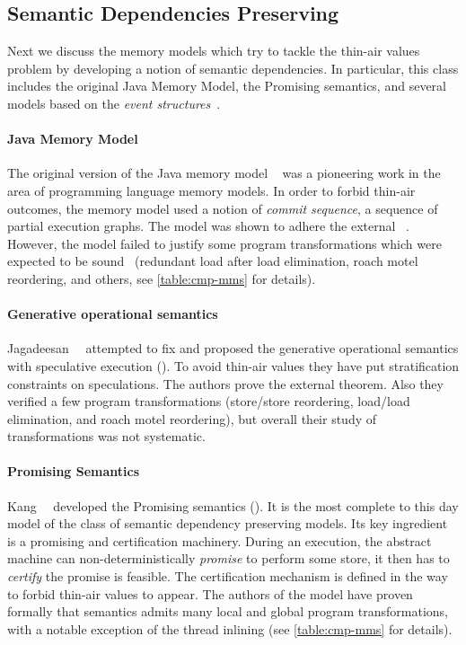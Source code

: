 \subsection{Semantic Dependencies Preserving}
\label{sec:catalog:sdeprf}

Next we discuss the memory models 
which try to tackle the thin-air values problem 
by developing a notion of semantic dependencies. 
In particular, this class includes the original Java Memory Model, 
the Promising semantics, and several models based 
on the \emph{event structures}~\cite{Winskel:86}.

\paragraph{Java Memory Model}
\label{sec:catalog:jmm}

The original version of the Java memory model \JMM~\cite{Manson-al:POPL05}
was a pioneering work in the area of programming language memory models. 
In order to forbid thin-air outcomes, the memory model used 
a notion of \emph{commit sequence}, \ie a sequence of partial execution graphs.
The model was shown to adhere the external \DRF~\cite{Huisman-Petri:CONCUR07}.
However, the model failed to justify some program transformations 
which were expected to be sound~\cite{Sevcik-Aspinall:ECOOP08} 
(\eg redundant load after load elimination, roach motel reordering, and others,
see \cref{table:cmp-mms} for details). 

\paragraph{Generative operational semantics}

Jagadeesan~\etal~\cite{Jagadeesan-al:ESOP10} attempted to fix \JMM 
and proposed the generative operational semantics 
with speculative execution (\GOS).
To avoid thin-air values they have put stratification constraints 
on speculations. The authors prove the external \DRF theorem. 
Also they verified a few program transformations 
(store/store reordering, load/load elimination, and roach motel reordering), 
but overall their study of transformations was not systematic.  

\paragraph{Promising Semantics}

Kang~\etal~\cite{Kang-al:POPL17, Lee-al:PLDI20} developed 
the Promising semantics (\PRM).
It is the most complete to this day model of the class of
semantic dependency preserving models. 
Its key ingredient is a promising and certification machinery.
During an execution, the abstract machine can 
non-deterministically \emph{promise} to perform some store,
it then has to \emph{certify} the promise is feasible. 
The certification mechanism is defined in the way to forbid thin-air values to appear.
The authors of the model have proven formally 
that \Promising semantics admits many local and global program transformations,
with a notable exception of the thread inlining
(see \cref{table:cmp-mms} for details).

